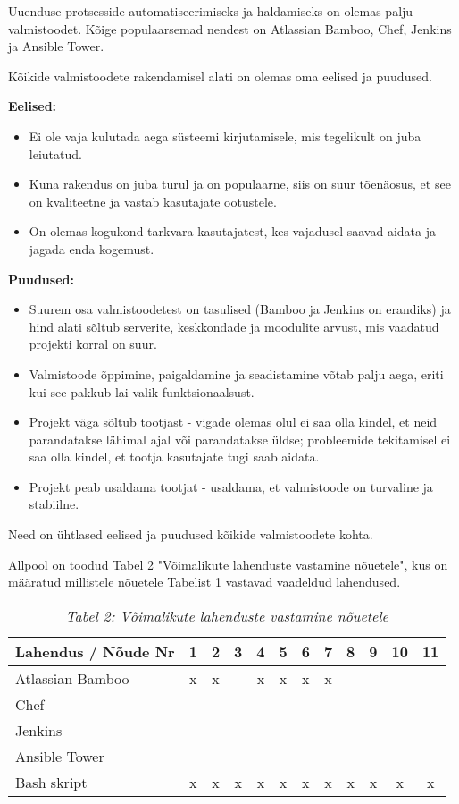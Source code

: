 \documentclass[12pt]{report}
\begin{document}
  Uuenduse protsesside automatiseerimiseks ja haldamiseks on olemas palju valmistoodet. Kõige populaarsemad nendest on Atlassian Bamboo, Chef, Jenkins ja Ansible Tower.
  
  Kõikide valmistoodete rakendamisel alati on olemas oma eelised ja puudused.
  
  \textbf{Eelised:}
  \begin{itemize}
    \item Ei ole vaja kulutada aega süsteemi kirjutamisele, mis tegelikult on juba leiutatud.
    \item Kuna rakendus on juba turul ja on populaarne, siis on suur tõenäosus, et see on kvaliteetne ja vastab kasutajate ootustele.
    \item On olemas kogukond tarkvara kasutajatest, kes vajadusel saavad aidata ja jagada enda kogemust.
  \end{itemize}
  
  \textbf{Puudused:}
  \begin{itemize}
    \item Suurem osa valmistoodetest on tasulised (Bamboo ja Jenkins on erandiks) ja hind alati sõltub serverite, keskkondade ja moodulite arvust, mis vaadatud projekti korral on suur.
    \item Valmistoode õppimine, paigaldamine ja seadistamine võtab palju aega, eriti kui see pakkub lai valik funktsionaalsust.
    \item Projekt väga sõltub tootjast \-- vigade olemas olul ei saa olla kindel, et neid parandatakse lähimal ajal või parandatakse üldse; probleemide tekitamisel ei saa olla kindel, et tootja kasutajate tugi saab aidata.
    \item Projekt peab usaldama tootjat \-- usaldama, et valmistoode on turvaline ja stabiilne.
  \end{itemize}
  
  Need on ühtlased eelised ja puudused kõikide valmistoodete kohta.
  
  Allpool on toodud Tabel 2 "Võimalikute lahenduste vastamine nõuetele", kus on määratud millistele nõuetele Tabelist 1 vastavad vaadeldud lahendused.
  
  \begin{table}
    \begin{tabular}{ |l|c|c|c|c|c|c|c|c|c|c|c| }
      \hline
      \textbf{Lahendus / Nõude Nr} & \textbf{1} & \textbf{2} & \textbf{3} & \textbf{4} & \textbf{5} & \textbf{6} & \textbf{7} & \textbf{8} & \textbf{9} & \textbf{10} & \textbf{11}\\
      \hline
      Atlassian Bamboo & x & x & & x & x & x & x & & & & \\
      \hline
      Chef & & & & & & & & & & & \\
      \hline
      Jenkins & & & & & & & & & & & \\
      \hline
      Ansible Tower & & & & & & & & & & & \\
      \hline
      Bash skript & x & x & x & x & x & x & x & x & x & x & x\\
      \hline
    \end{tabular}
    \caption*{\textit{Tabel 2: Võimalikute lahenduste vastamine nõuetele}}
  \end{table}
\end{document}
